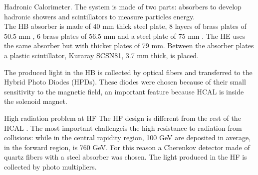 \documentclass[8pt]{beamer}
\begin{document}
\begin{frame}[fragile]{Hadronic Calorimeter.}
	The system is made of two parts: absorbers to develop hadronic showers and scintillators to measure particles energy. 
	\\
	The HB absorber	is made of 40 mm thick steel plate, 8 layers of brass plates of 50.5 mm , 6 brass plates of 56.5 mm and a steel plate of 75 mm . The HE	uses the same absorber but with thicker plates of 79 mm. Between the absorber	plates a plastic scintillator, Kuraray SCSN81, 3.7 mm thick, is placed.
	\\
	\begin{exampleblock}{}
		The produced light in the HB is collected by optical fibers and
		transferred to the Hybrid Photo Diodes (HPDs). These diodes were chosen because
		of their small sensitivity to the magnetic field, an important feature because HCAL
		is inside the solenoid magnet.
		
	\end{exampleblock}
	
	\begin{exampleblock}{High radiation problem at HF}
		The HF design is different from the rest of the HCAL . The most
		important challengeis the high resistance to radiation from collisions:
		while in the central rapidity region, 100 GeV are deposited in average, in the
		forward region, is 760 GeV. For this reason a Cherenkov detector made of quartz fibers with a steel absorber was chosen. The light produced in the
		HF is collected by photo multipliers.
		
	\end{exampleblock}

	
\end{frame}
\end{document}

